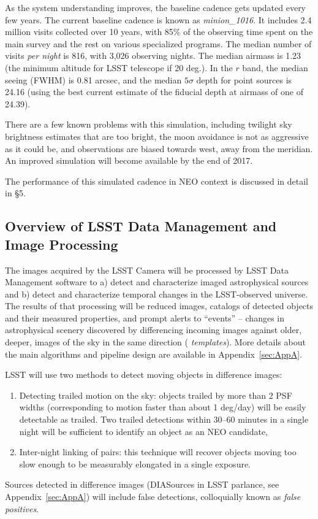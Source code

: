 As the system understanding improves, the baseline cadence gets updated every few
years. The current baseline cadence is known as {\it minion\_1016}. It includes 2.4
million visits collected over 10 years, with 85\% of the observing time spent on the 
main survey and the rest on various specialized programs. The median number of visits
{\it per night} is 816, with 3,026 observing nights. The median airmass is 1.23 (the
minimum altitude for LSST telescope if 20 deg.). In the $r$ band, the median seeing 
(FWHM) is 0.81 arcsec, and the median $5\sigma$ depth for point sources is 24.16 
(using the best current estimate of the fiducial depth at airmass of one of 24.39). 

There are a few known problems with this simulation, including twilight sky brightness
estimates that are too bright, the moon avoidance is not as aggressive as it could be,
and observations are biased towards west, away from the meridian. An improved 
simulation will become available by the end of 2017. 

The performance of this simulated cadence in NEO context is discussed in detail in \S5. 


\subsection{Overview of LSST  Data Management and Image Processing} 

The images acquired by the LSST Camera will be processed by LSST Data Management
software \cite{juric15} to a) detect and characterize imaged
astrophysical sources and b) detect and characterize temporal changes
in the LSST-observed universe. The results of that processing will be
reduced images, catalogs of detected objects and their measured properties, and 
prompt alerts to ``events'' -- changes in astrophysical scenery discovered by differencing 
incoming images against older, deeper, images of the sky in the same direction ({\em
templates}). More details about the main algorithms and pipeline design are available
in Appendix~\ref{sec:AppA}. 

LSST will use two methods to detect moving objects in difference images: 
\begin{enumerate}
\item Detecting trailed motion on the sky: objects trailed by more
  than 2 PSF widths (corresponding to motion faster than about 1
  deg/day) will be easily detectable as trailed.  Two trailed
  detections within 30--60 minutes in a single night will be
  sufficient to identify an object as an NEO candidate,
\item Inter-night linking of pairs: this technique will recover
  objects moving too slow enough to be measurably elongated in 
  a single exposure. 
\end{enumerate} 


Sources detected in difference images (DIASources in LSST parlance, see Appendix~\ref{sec:AppA})
will include false detections, colloquially known as {\it false positives}. 

